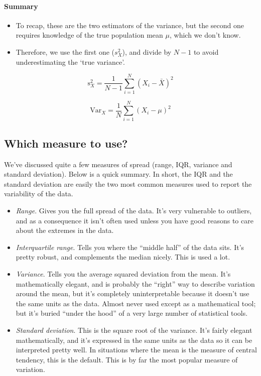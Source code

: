 \documentclass[
]{book}
\providecommand{\tightlist}{%
  \setlength{\itemsep}{0pt}\setlength{\parskip}{0pt}}
\begin{document}
\hypertarget{summary-1}{%
\paragraph{Summary}\label{summary-1}}

\begin{itemize}
\tightlist
\item
  To recap, these are the two estimators of the variance, but the second one requires knowledge of the true population mean \(\mu\), which we don't know.
\item
  Therefore, we use the first one (\(s_X^2\)), and divide by \(N-1\) to avoid underestimating the `true variance'.
\end{itemize}

\[
\mbox{s}_X^2 = \frac{1}{N-1} \sum_{i=1}^N \left( X_i - \bar{X} \right)^2
\]

\[
\mbox{Var}_X = \frac{1}{N} \sum_{i=1}^N \left( X_i - \mu \right)^2
\]

\hypertarget{which-measure-to-use}{%
\subsection{Which measure to use?}\label{which-measure-to-use}}

We've discussed quite a few measures of spread (range, IQR, variance and standard deviation). Below is a quick summary.
In short, the IQR and the standard deviation are easily the two most common measures used to report the variability of the data.

\begin{itemize}
\tightlist
\item
  \emph{Range}. Gives you the full spread of the data. It's very vulnerable to outliers, and as a consequence it isn't often used unless you have good reasons to care about the extremes in the data.
\item
  \emph{Interquartile range}. Tells you where the ``middle half'' of the data sits. It's pretty robust, and complements the median nicely. This is used a lot.
\item
  \emph{Variance}. Tells you the average squared deviation from the mean. It's mathematically elegant, and is probably the ``right'' way to describe variation around the mean, but it's completely uninterpretable because it doesn't use the same units as the data. Almost never used except as a mathematical tool; but it's buried ``under the hood'' of a very large number of statistical tools.
\item
  \emph{Standard deviation}. This is the square root of the variance. It's fairly elegant mathematically, and it's expressed in the same units as the data so it can be interpreted pretty well. In situations where the mean is the measure of central tendency, this is the default. This is by far the most popular measure of variation.
\end{itemize}
\end{document}

